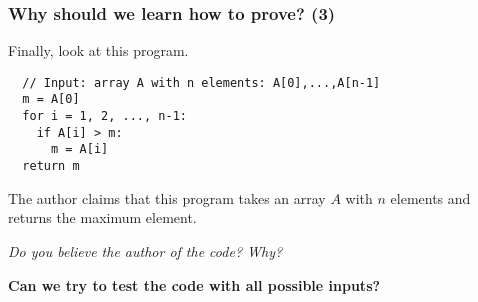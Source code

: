 \documentclass{beamer}
\begin{document}
\begin{frame}[fragile]\frametitle{Why should we learn how to prove? (3)}
  Finally, look at this program.

  {\small
\begin{verbatim}
  // Input: array A with n elements: A[0],...,A[n-1]
  m = A[0]
  for i = 1, 2, ..., n-1:
    if A[i] > m:
      m = A[i]
  return m  
\end{verbatim}
  }
  
  The author claims that this program takes an array $A$ with $n$
  elements and returns the maximum element.  \pause
  
  {\em Do you believe the author of the code? \pause Why?}
  \pause

  {\bf Can we try to test the code with all possible inputs?}
\end{frame}
\end{document}
